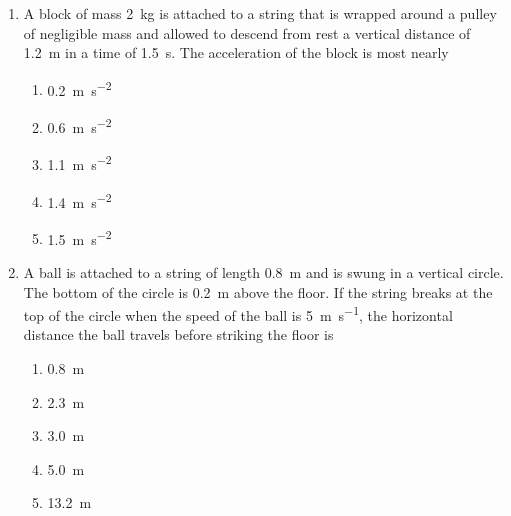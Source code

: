 \documentclass{../../../oss-apphys}
\begin{document}
\begin{multicols}{2}
\begin{enumerate}[resume,leftmargin=18pt]
  \item A block of mass \SI{2}{\kilo\gram} is attached to a string that is
    wrapped around a pulley of negligible mass and allowed to descend from rest
    a vertical distance of \SI{1.2}{\metre} in a time of \SI{1.5}{\second}. The
    acceleration of the block is most nearly
    \begin{center}
      \vspace{-.2in}
    \end{center}
    \begin{enumerate}[nosep,leftmargin=18pt,label=(\Alph*)]
    \item\SI{0.2}{\metre\per\second^2}
    \item\SI{.6}{\metre\per\second^2}
    \item\SI{1.1}{\metre\per\second^2}
    \item\SI{1.4}{\metre\per\second^2}
    \item\SI{1.5}{\metre\per\second^2}
    \end{enumerate}

    
  \item A ball is attached to a string of length \SI{.8}{\metre} and is swung
    in a vertical circle. The bottom of the circle is \SI{.2}{\metre} above the
    floor. If the string breaks at the top of the circle when the speed of the
    ball is \SI{5}{\metre\per\second}, the horizontal distance the ball travels before
    striking the floor is
    \begin{center}
      \vspace{-.2in}
    \end{center}
    \begin{enumerate}[nosep,leftmargin=18pt,label=(\Alph*)]
    \item\SI{.8 }{\metre}
    \item\SI{2.3 }{\metre}
    \item\SI{3.0 }{\metre}
    \item\SI{5.0 }{\metre}
    \item\SI{13.2}{\metre}
    \end{enumerate}
    

\end{enumerate}
\end{multicols}
\end{document}
